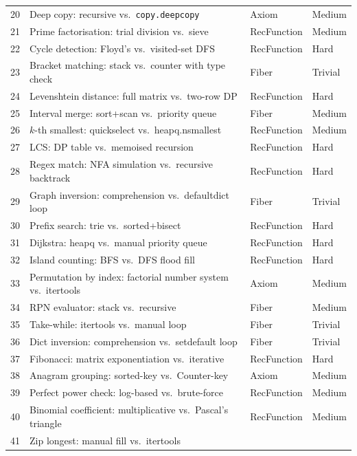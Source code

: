 \documentclass[11pt,a4paper]{report}
\theoremstyle{definition}
\theoremstyle{plain}
\begin{document}
\begin{center}
\begin{tabular}{r p{5.5cm} l l}
  20 & Deep copy: recursive vs.\ \texttt{copy.deepcopy}
     & Axiom & Medium \\
  21 & Prime factorisation: trial division vs.\ sieve
     & RecFunction & Medium \\
  22 & Cycle detection: Floyd's vs.\ visited-set DFS
     & RecFunction & Hard \\
  23 & Bracket matching: stack vs.\ counter with type check
     & Fiber & Trivial \\
  24 & Levenshtein distance: full matrix vs.\ two-row DP
     & RecFunction & Hard \\
  25 & Interval merge: sort+scan vs.\ priority queue
     & Fiber & Medium \\
  26 & $k$-th smallest: quickselect vs.\ heapq.nsmallest
     & RecFunction & Medium \\
  27 & LCS: DP table vs.\ memoised recursion
     & RecFunction & Hard \\
  28 & Regex match: NFA simulation vs.\ recursive backtrack
     & RecFunction & Hard \\
  29 & Graph inversion: comprehension vs.\ defaultdict loop
     & Fiber & Trivial \\
  30 & Prefix search: trie vs.\ sorted+bisect
     & RecFunction & Hard \\
  31 & Dijkstra: heapq vs.\ manual priority queue
     & RecFunction & Hard \\
  32 & Island counting: BFS vs.\ DFS flood fill
     & RecFunction & Hard \\
  33 & Permutation by index: factorial number system vs.\ itertools
     & Axiom & Medium \\
  34 & RPN evaluator: stack vs.\ recursive
     & Fiber & Medium \\
  35 & Take-while: itertools vs.\ manual loop
     & Fiber & Trivial \\
  36 & Dict inversion: comprehension vs.\ setdefault loop
     & Fiber & Trivial \\
  37 & Fibonacci: matrix exponentiation vs.\ iterative
     & RecFunction & Hard \\
  38 & Anagram grouping: sorted-key vs.\ Counter-key
     & Axiom & Medium \\
  39 & Perfect power check: log-based vs.\ brute-force
     & RecFunction & Medium \\
  40 & Binomial coefficient: multiplicative vs.\ Pascal's triangle
     & RecFunction & Medium \\
  41 & Zip longest: manual fill vs.\ itertools

\end{tabular}
\end{center}
\end{document}
